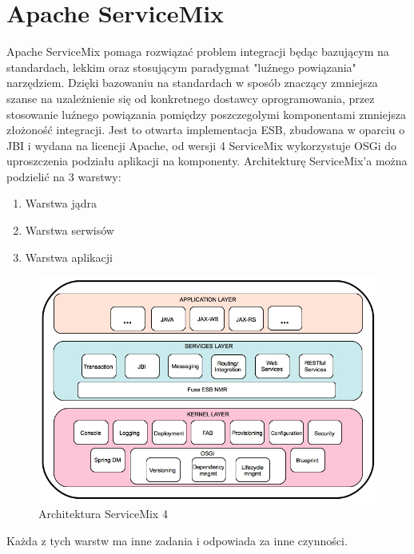 \section{Apache ServiceMix}
Apache ServiceMix pomaga rozwiązać problem integracji będąc bazującym na standardach, lekkim oraz stosującym paradygmat "luźnego powiązania" narzędziem. Dzięki bazowaniu na standardach w sposób znaczący zmniejsza szanse na uzależnienie się od konkretnego dostawcy oprogramowania, przez stosowanie luźnego powiązania pomiędzy poszczegolymi komponentami zmniejsza złożoność integracji. Jest to otwarta implementacja ESB, zbudowana w oparciu o JBI i wydana na licencji Apache, od wersji 4 ServiceMix wykorzystuje OSGi do uproszczenia podziału aplikacji na komponenty. 	
Architekturę ServiceMix'a można podzielić na 3 warstwy:
\begin{enumerate}
	\item Warstwa jądra
	\item Warstwa serwisów
	\item Warstwa aplikacji
\end{enumerate}  
\begin{figure}[!h]
	\centering
	\includegraphics[scale=0.45]{ServiceMixArchitektura.jpg} 
	\caption{Architektura ServiceMix 4}
\end{figure}
Każda z tych warstw ma inne zadania i odpowiada za inne czynności.
